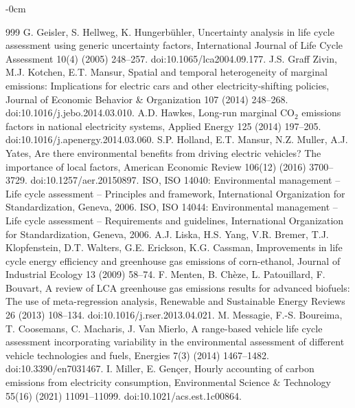 \documentclass[cleantechnol,article,submit,pdftex,moreauthors]{Definitions/mdpi}
\begin{document}
\begin{adjustwidth}{-\extralength}{0cm}
\begin{thebibliography}{999}
G. Geisler, S. Hellweg, K. Hungerbühler, Uncertainty analysis in life cycle assessment using generic uncertainty factors, International Journal of Life Cycle Assessment 10(4) (2005) 248--257. doi:10.1065/lca2004.09.177.
J.S. Graff Zivin, M.J. Kotchen, E.T. Mansur, Spatial and temporal heterogeneity of marginal emissions: Implications for electric cars and other electricity-shifting policies, Journal of Economic Behavior \& Organization 107 (2014) 248--268. doi:10.1016/j.jebo.2014.03.010.
A.D. Hawkes, Long-run marginal CO$_2$ emissions factors in national electricity systems, Applied Energy 125 (2014) 197--205. doi:10.1016/j.apenergy.2014.03.060.
S.P. Holland, E.T. Mansur, N.Z. Muller, A.J. Yates, Are there environmental benefits from driving electric vehicles? The importance of local factors, American Economic Review 106(12) (2016) 3700--3729. doi:10.1257/aer.20150897.
ISO, ISO 14040: Environmental management -- Life cycle assessment -- Principles and framework, International Organization for Standardization, Geneva, 2006.
ISO, ISO 14044: Environmental management -- Life cycle assessment -- Requirements and guidelines, International Organization for Standardization, Geneva, 2006.
A.J. Liska, H.S. Yang, V.R. Bremer, T.J. Klopfenstein, D.T. Walters, G.E. Erickson, K.G. Cassman, Improvements in life cycle energy efficiency and greenhouse gas emissions of corn-ethanol, Journal of Industrial Ecology 13 (2009) 58--74.
F. Menten, B. Chèze, L. Patouillard, F. Bouvart, A review of LCA greenhouse gas emissions results for advanced biofuels: The use of meta-regression analysis, Renewable and Sustainable Energy Reviews 26 (2013) 108--134. doi:10.1016/j.rser.2013.04.021.
M. Messagie, F.-S. Boureima, T. Coosemans, C. Macharis, J. Van Mierlo, A range-based vehicle life cycle assessment incorporating variability in the environmental assessment of different vehicle technologies and fuels, Energies 7(3) (2014) 1467--1482. doi:10.3390/en7031467.
I. Miller, E. Gençer, Hourly accounting of carbon emissions from electricity consumption, Environmental Science \& Technology 55(16) (2021) 11091--11099. doi:10.1021/acs.est.1c00864.

\end{thebibliography}
\end{adjustwidth}
\end{document}
